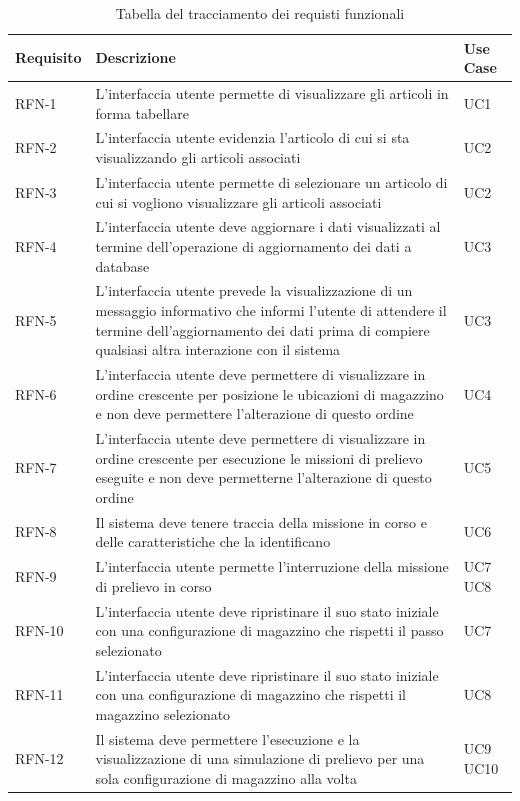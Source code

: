 \begin{table}
\caption{Tabella del tracciamento dei requisti funzionali}
\label{tab:requisiti-funzionali}
\begin{tabularx}{\textwidth}{lXl}
\hline\hline
\textbf{Requisito} & \textbf{Descrizione} & \textbf{Use Case}\\
\hline
RFN-1     & L'interfaccia utente permette di visualizzare gli articoli in forma tabellare & UC1 \\
RFN-2     & L'interfaccia utente evidenzia l'articolo di cui si sta visualizzando gli articoli associati & UC2 \\
RFN-3     & L'interfaccia utente permette di selezionare un articolo di cui si vogliono visualizzare gli articoli associati & UC2 \\ 
RFN-4     & L'interfaccia utente deve aggiornare i dati visualizzati al termine dell'operazione di aggiornamento dei dati a database & UC3 \\ 
RFN-5     & L'interfaccia utente prevede la visualizzazione di un messaggio informativo che informi l'utente di attendere il termine dell'aggiornamento dei dati prima di compiere qualsiasi altra
interazione con il sistema & UC3 \\ 
RFN-6     & L'interfaccia utente deve permettere di visualizzare in ordine crescente per posizione le ubicazioni di magazzino e non deve permettere l'alterazione di questo ordine & UC4 \\ 
RFN-7     & L'interfaccia utente deve permettere di visualizzare in ordine crescente per esecuzione le missioni di prelievo eseguite e non deve permetterne l'alterazione di questo ordine & UC5 \\ 
RFN-8     & Il sistema deve tenere traccia della missione in corso e delle caratteristiche che la identificano & UC6 \\ 
RFN-9     & L'interfaccia utente permette l'interruzione della missione di prelievo in corso & UC7 UC8\\ 
RFN-10    & L'interfaccia utente deve ripristinare il suo stato iniziale con una configurazione di magazzino che rispetti il passo selezionato & UC7 \\ 
RFN-11    & L'interfaccia utente deve ripristinare il suo stato iniziale con una configurazione di magazzino che rispetti il magazzino selezionato & UC8 \\ 
RFN-12    & Il sistema deve permettere l'esecuzione e la visualizzazione di una simulazione di prelievo per una sola configurazione di magazzino alla volta & UC9 UC10 \\ 

\end{tabularx}
\end{table}
